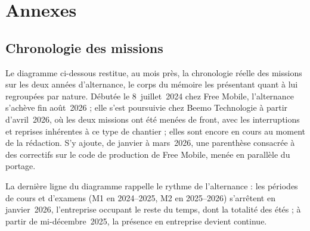 \chapter{Annexes}
\label{chap:annexes}

\section{Chronologie des missions}
Le diagramme ci-dessous restitue, au mois près, la chronologie réelle des
missions sur les deux années d'alternance, le corps du mémoire les
présentant quant à lui regroupées par nature. Débutée le 8~juillet~2024
chez Free Mobile, l'alternance s'achève fin août~2026 ; elle s'est
poursuivie chez Beemo Technologie à partir d'avril~2026, où les deux
missions ont été menées de front, avec les interruptions et reprises
inhérentes à ce type de chantier ; elles sont encore en cours au moment de
la rédaction. S'y ajoute, de janvier à mars~2026, une parenthèse consacrée
à des correctifs sur le code de production de Free Mobile, menée en
parallèle du portage.

La dernière ligne du diagramme rappelle le rythme de l'alternance : les
périodes de cours et d'examens (M1 en 2024--2025, M2 en 2025--2026)
s'arrêtent en janvier~2026, l'entreprise occupant le reste du temps, dont
la totalité des étés ; à partir de mi-décembre~2025, la présence en
entreprise devient continue.

